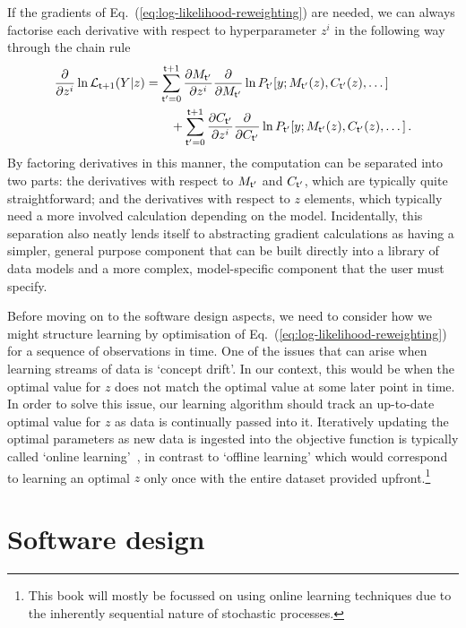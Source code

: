 If the gradients of Eq.~(\ref{eq:log-likelihood-reweighting}) are needed, we can always factorise each derivative with respect to hyperparameter $z^i$ in the following way through the chain rule
\begin{align}
\frac{\partial}{\partial z^i}\ln {\cal L}_{{\sf t}+1}(Y \vert z) &= \sum_{{\sf t}'=0}^{{\sf t}+1}\frac{\partial M_{{\sf t}'}}{\partial z^i}\frac{\partial}{\partial M_{{\sf t}'}}\ln P_{{\sf t}'}[y;M_{{\sf t}'}(z),C_{{\sf t}'}(z),\dots ] \nonumber \\
&\qquad + \sum_{{\sf t}'=0}^{{\sf t}+1}\frac{\partial C_{{\sf t}'}}{\partial z^i}\frac{\partial }{\partial C_{{\sf t}'}}\ln P_{{\sf t}'}[y;M_{{\sf t}'}(z),C_{{\sf t}'}(z),\dots ] \,. \label{eq:log-likelihood-reweighting-grad}
\end{align}
By factoring derivatives in this manner, the computation can be separated into two parts: the derivatives with respect to $M_{{\sf t}'}$ and $C_{{\sf t}'}$, which are typically quite straightforward; and the derivatives with respect to $z$ elements, which typically need a more involved calculation depending on the model. Incidentally, this separation also neatly lends itself to abstracting gradient calculations as having a simpler, general purpose component that can be built directly into a library of data models and a more complex, model-specific component that the user must specify.

Before moving on to the software design aspects, we need to consider how we might structure learning by optimisation of Eq.~(\ref{eq:log-likelihood-reweighting}) for a sequence of observations in time. One of the issues that can arise when learning streams of data is `concept drift'. In our context, this would be when the optimal value for $z$ does not match the optimal value at some later point in time. In order to solve this issue, our learning algorithm should track an up-to-date optimal value for $z$ as data is continually passed into it. Iteratively updating the optimal parameters as new data is ingested into the objective function is typically called `online learning'~\cite{hazan2016introduction,sutton2018reinforcement}, in contrast to `offline learning' which would correspond to learning an optimal $z$ only once with the entire dataset provided upfront.\footnote{This book will mostly be focussed on using online learning techniques due to the inherently sequential nature of stochastic processes.}


\section{\sffamily Software design}

